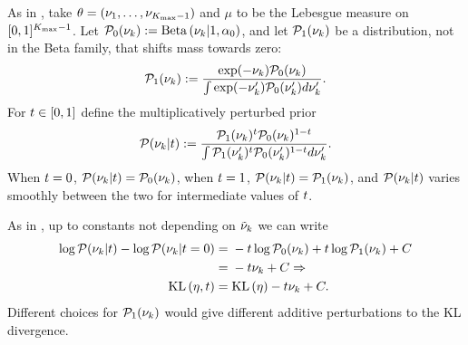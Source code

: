 \begin{ex}
%
As in , take $\theta = (\nu_1, \ldots, \nu_{{K_{\mathrm{max}}}-1})$
and $\mu$ to be the Lebesgue measure on $[0,1]^{{K_{\mathrm{max}}}-1}$. Let $\mathcal{P}_{0}(\nu_{k}) :=
\mathrm{Beta}\left(\nu_{k} \vert 1, \alpha_0\right)$, and let $\mathcal{P}_{1}(\nu_{k})$ be a distribution, not
in the Beta family, that shifts mass towards zero:
%
\begin{align*}
%
\palt(\nuk) :=
    \frac{\exp(-\nuk)\pbase(\nuk)}{\int \exp(-\nuk')\pbase(\nuk') d\nuk'}.
%
\end{align*}
%
For $t \in [0,1]$ define the multiplicatively perturbed prior
%
\begin{align*}
%
\p(\nuk \vert \t) :=
    \frac{\palt(\nuk)^{\t} \pbase(\nuk)^{1-\t}}
         {\int \palt(\nuk')^{\t} \pbase(\nuk')^{1-\t} d\nuk'}.
%
\end{align*}
%
When $t = 0$, $\mathcal{P}(\nu_{k} \vert t) = \mathcal{P}_{0}(\nu_{k})$, when $t = 1$,
$\mathcal{P}(\nu_{k} \vert t)  = \mathcal{P}_{1}(\nu_{k})$, and $\mathcal{P}(\nu_{k} \vert t)$ varies smoothly
between the two for intermediate values of $t$.

As in , up to constants not depending on
$\tilde{\nu}_{k}$ we can write
%
\begin{align*}
%
\log \p(\nuk \vert \t) - \log \p(\nuk \vert \t=0) ={}&
    -\t \log \pbase(\nuk) + \t \log \palt(\nuk) + \const
\\={}& -\t \nuk + \const \Rightarrow
\\
\KL{\eta, \t} ={}& \KL{\eta} -\t \nuk + \const.
%
\end{align*}
%
Different choices for $\mathcal{P}_{1}(\nu_{k})$ would give different additive
perturbations to the KL divergence.
%
\end{ex}
%
